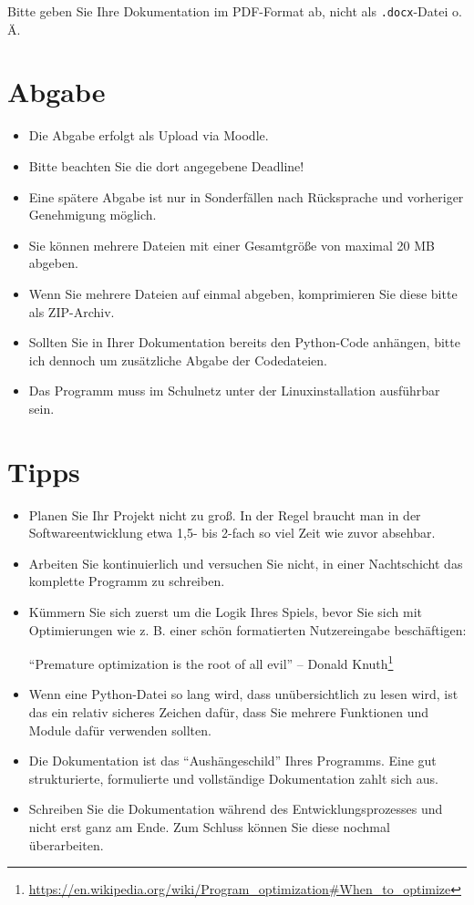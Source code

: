 \documentclass[11pt, a4paper, oneside]{article}
\begin{document}
	Bitte geben Sie Ihre Dokumentation im PDF-Format ab, nicht als \texttt{.docx}-Datei o. Ä.
	
	\section{Abgabe}
	
	\begin{itemize}
		\item Die Abgabe erfolgt als Upload via Moodle.
		\item Bitte beachten Sie die dort angegebene Deadline!
		\item Eine spätere Abgabe ist nur in Sonderfällen nach Rücksprache und vorheriger Genehmigung möglich.
		\item Sie können mehrere Dateien mit einer Gesamtgröße von maximal 20 MB abgeben.
		\item Wenn Sie mehrere Dateien auf einmal abgeben, komprimieren Sie diese bitte als ZIP-Archiv.
		\item Sollten Sie in Ihrer Dokumentation bereits den Python-Code anhängen, bitte ich dennoch um zusätzliche Abgabe der Codedateien.
		\item Das Programm muss im Schulnetz unter der Linuxinstallation ausführbar sein.
	\end{itemize}
	
	\section{Tipps}
	
	\begin{itemize}
		\item Planen Sie Ihr Projekt nicht zu groß.
		In der Regel braucht man in der Softwareentwicklung etwa 1,5- bis 2-fach so viel Zeit wie zuvor absehbar.
		\item Arbeiten Sie kontinuierlich und versuchen Sie nicht, in einer Nachtschicht das komplette Programm zu schreiben.
		\item Kümmern Sie sich zuerst um die Logik Ihres Spiels, bevor Sie sich mit Optimierungen wie z. B. einer schön formatierten Nutzereingabe beschäftigen:
		
		``Premature optimization is the root of all evil'' -- Donald Knuth\footnote{\url{https://en.wikipedia.org/wiki/Program_optimization\#When_to_optimize}}
		\item Wenn eine Python-Datei so lang wird, dass unübersichtlich zu lesen wird, ist das ein relativ sicheres Zeichen dafür, dass Sie mehrere Funktionen und Module dafür verwenden sollten.
		\item Die Dokumentation ist das ``Aushängeschild'' Ihres Programms.
		Eine gut strukturierte, formulierte und vollständige Dokumentation zahlt sich aus.
		\item Schreiben Sie die Dokumentation während des Entwicklungsprozesses und nicht erst ganz am Ende.
		Zum Schluss können Sie diese nochmal überarbeiten.
	\end{itemize}
\end{document}
